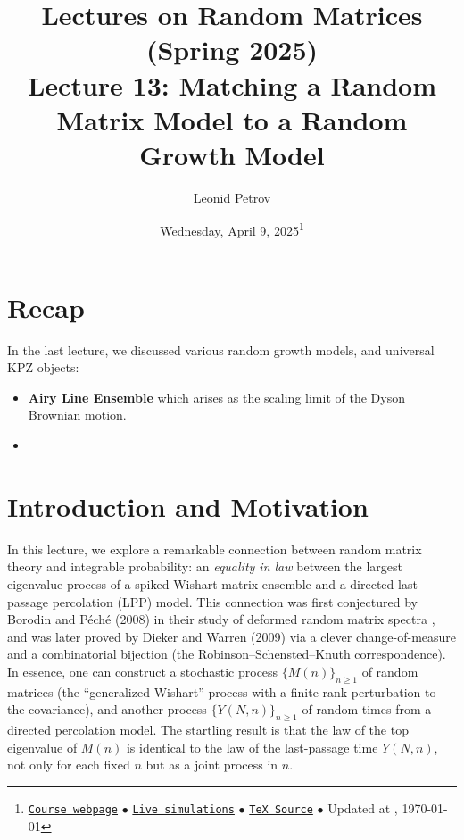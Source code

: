 \documentclass[letterpaper,11pt,oneside,reqno]{article}
\numberwithin{equation}{section}
\theoremstyle{definition}
\begin{document}
\title{Lectures on Random Matrices
(Spring 2025)
\\Lecture 13: Matching a Random Matrix Model to a Random Growth Model}


\date{Wednesday, April 9, 2025\footnote{\href{https://lpetrov.cc/rmt25/}{\texttt{Course webpage}}
$\bullet$ \href{https://lpetrov.cc/simulations/model/random-matrices/}{\texttt{Live simulations}}
$\bullet$ \href{https://lpetrov.cc/rmt25/rmt25-notes/rmt2025-l13.tex}{\texttt{TeX Source}}
$\bullet$
Updated at \currenttime, \today}}



\author{Leonid Petrov}


\maketitle

\section{Recap}

In the last lecture, we discussed various random growth models, and universal KPZ objects:
\begin{itemize}
	\item \textbf{Airy Line Ensemble} which arises as the scaling limit of the Dyson Brownian motion.
	\item
\end{itemize}


\section{Introduction and Motivation}
In this lecture, we explore a remarkable connection between
random matrix theory and integrable probability: an
\emph{equality in law} between the largest eigenvalue
process of a spiked Wishart matrix ensemble and a directed
last-passage percolation (LPP) model. This connection was
first conjectured by Borodin and P\'ech\'e (2008) in their
study of deformed random matrix spectra
\cite{BorodinPeche2009}, and was later proved by Dieker and
Warren (2009) \cite{diekerWarren2008determinantal} via a
clever change-of-measure and a combinatorial bijection (the
Robinson--Schensted--Knuth correspondence). In essence, one
can construct a stochastic process $\{M(n)\}_{n\ge1}$ of
random matrices (the ``generalized Wishart'' process with a
finite-rank perturbation to the covariance), and another
process $\{Y(N,n)\}_{n\ge1}$ of random times from a directed
percolation model. The startling result is that the law of
the top eigenvalue of $M(n)$ is identical to the law of the
last-passage time $Y(N,n)$, not only for each fixed $n$ but
as a joint process in $n$.
\end{document}
